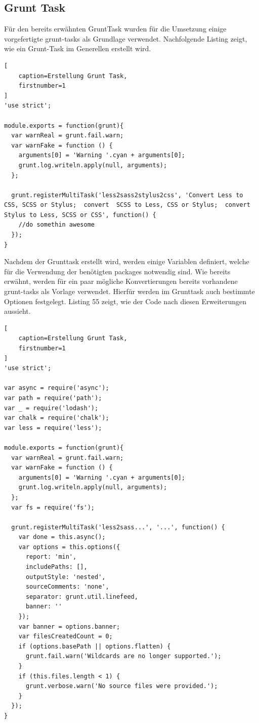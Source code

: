 \subsection{Grunt Task}

Für den bereits erwähnten GruntTask wurden für die Umsetzung einige vorgefertigte grunt-tasks als Grundlage verwendet. Nachfolgende Listing zeigt, wie ein Grunt-Task im Generellen erstellt wird.
\begin{lstlisting}[
	caption=Erstellung Grunt Task,
	firstnumber=1
]
'use strict';

module.exports = function(grunt){
  var warnReal = grunt.fail.warn;
  var warnFake = function () {
    arguments[0] = 'Warning '.cyan + arguments[0];
    grunt.log.writeln.apply(null, arguments);
  };

  grunt.registerMultiTask('less2sass2stylus2css', 'Convert Less to CSS, SCSS or Stylus;  convert  SCSS to Less, CSS or Stylus;  convert Stylus to Less, SCSS or CSS', function() {  
    //do somethin awesome	
  });
}
\end{lstlisting}
Nachdem der Grunttask erstellt wird, werden einige Variablen definiert, welche für die Verwendung der benötigten packages notwendig sind. Wie bereits erwähnt, werden für ein paar mögliche Konvertierungen bereits vorhandene grunt-tasks als Vorlage verwendet. Hierfür werden im Grunttask auch bestimmte Optionen festgelegt.\newline
Listing 55 zeigt, wie der Code nach diesen Erweiterungen aussieht.
\begin{lstlisting}[
	caption=Erstellung Grunt Task,
	firstnumber=1
]
'use strict';

var async = require('async');
var path = require('path');
var _ = require('lodash');
var chalk = require('chalk');
var less = require('less');

module.exports = function(grunt){
  var warnReal = grunt.fail.warn;
  var warnFake = function () {
    arguments[0] = 'Warning '.cyan + arguments[0];
    grunt.log.writeln.apply(null, arguments);
  };
  var fs = require('fs');
		
  grunt.registerMultiTask('less2sass...', '...', function() {
    var done = this.async();
    var options = this.options({
      report: 'min',
      includePaths: [],
      outputStyle: 'nested',
      sourceComments: 'none',
      separator: grunt.util.linefeed,
      banner: ''
    });
    var banner = options.banner;
    var filesCreatedCount = 0;
    if (options.basePath || options.flatten) {
      grunt.fail.warn('Wildcards are no longer supported.');
    }
    if (this.files.length < 1) {
      grunt.verbose.warn('No source files were provided.');
    }
  });
}
\end{lstlisting}
